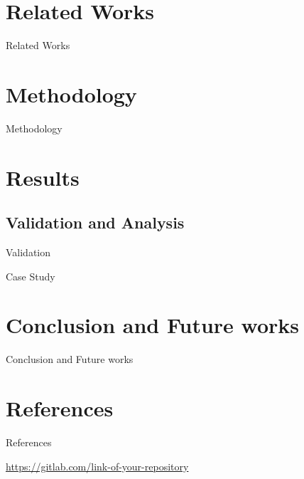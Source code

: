 \section{Related Works}

\begin{frame}{Related Works}
\end{frame}

\section{Methodology}

\begin{frame}{Methodology}
\end{frame}

\section{Results}

\subsection{Validation and Analysis}

\begin{frame}{Validation}
\end{frame}

\begin{frame}{Case Study}
\end{frame}

\section{Conclusion and Future works}

\begin{frame}{Conclusion and Future works}
\end{frame}

\section{References}

\begin{frame}[allowframebreaks]{References}
  \nocite{bronevetsky02, schmidt03:MSc, FSF:GNU-GPL, CORBA:spec, MenaChalco08, natbib, biblatex, eco:09}
  \printbibliography
\end{frame}

\begin{frame}{\insertshorttitle}
  \overview

  {%
    \centering\noindent%
    \url{https://gitlab.com/link-of-your-repository}\par
  }

\end{frame}


